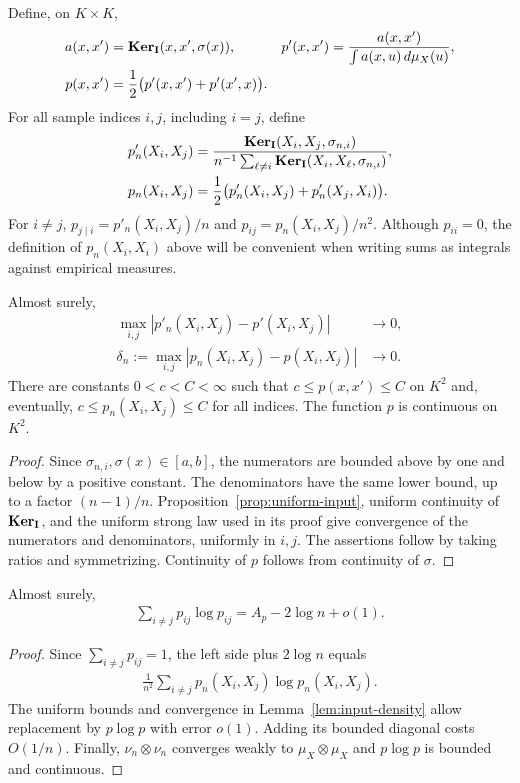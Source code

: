 Define, on $K\times K$,
\begin{align}\label{eq:input-density-notation}
a(x,x')&=\mathbf{Ker}_{\mathbf{I}}(x,x',\sigma(x)),
&p'(x,x')&=\frac{a(x,x')}{\int a(x,u)\,d\mu_X(u)},\\
p(x,x')&=\frac12\bigl(p'(x,x')+p'(x',x)\bigr).\nonumber
\end{align}
For all sample indices $i,j$, including $i=j$, define
\begin{align}\label{eq:scaled-input-array}
p'_n(X_i,X_j)&=\frac{\mathbf{Ker}_{\mathbf{I}}(X_i,X_j,\sigma_{n,i})}
{n^{-1}\sum_{\ell\ne i}\mathbf{Ker}_{\mathbf{I}}(X_i,X_\ell,\sigma_{n,i})},\\
p_n(X_i,X_j)&=\frac12\bigl(p'_n(X_i,X_j)+p'_n(X_j,X_i)\bigr).\nonumber
\end{align}
For $i\ne j$, $p_{j\mid i}=p'_n(X_i,X_j)/n$ and $p_{ij}=p_n(X_i,X_j)/n^2$. Although $p_{ii}=0$, the definition of $p_n(X_i,X_i)$ above will be convenient when writing sums as integrals against empirical measures.

\begin{lemma}\label{lem:input-density}
Almost surely,
\begin{align}\label{eq:input-density-convergence}
\max_{i,j}|p'_n(X_i,X_j)-p'(X_i,X_j)|&\longrightarrow0,\\
\delta_n:=\max_{i,j}|p_n(X_i,X_j)-p(X_i,X_j)|&\longrightarrow0.\nonumber
\end{align}
There are constants $0<c<C<\infty$ such that $c\leq p(x,x')\leq C$ on $K^2$ and, eventually, $c\leq p_n(X_i,X_j)\leq C$ for all indices. The function $p$ is continuous on $K^2$.
\end{lemma}
\begin{proof}
Since $\sigma_{n,i},\sigma(x)\in[a,b]$, the numerators are bounded above by one and below by a positive constant. The denominators have the same lower bound, up to a factor $(n-1)/n$. Proposition~\ref{prop:uniform-input}, uniform continuity of $\mathbf{Ker}_{\mathbf{I}}$, and the uniform strong law used in its proof give convergence of the numerators and denominators, uniformly in $i,j$. The assertions follow by taking ratios and symmetrizing. Continuity of $p$ follows from continuity of $\sigma$.
\end{proof}

\begin{lemma}\label{lem:input-entropy}
Almost surely,
\begin{align}\label{eq:input-entropy-limit}
\sum_{i\ne j}p_{ij}\log p_{ij}=A_p-2\log n+o(1).
\end{align}
\end{lemma}
\begin{proof}
Since $\sum_{i\ne j}p_{ij}=1$, the left side plus $2\log n$ equals
\begin{align*}
\frac1{n^2}\sum_{i\ne j}p_n(X_i,X_j)\log p_n(X_i,X_j).
\end{align*}
The uniform bounds and convergence in Lemma~\ref{lem:input-density} allow replacement by $p\log p$ with error $o(1)$. Adding its bounded diagonal costs $O(1/n)$. Finally, $\nu_n\otimes\nu_n$ converges weakly to $\mu_X\otimes\mu_X$ and $p\log p$ is bounded and continuous.
\end{proof}

